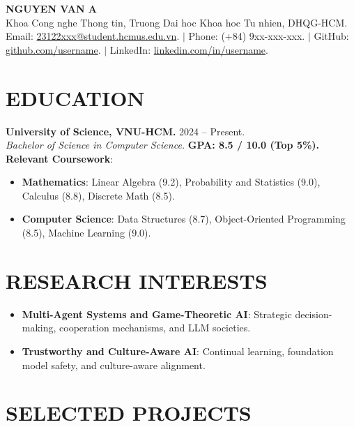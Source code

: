 \documentclass[10pt,a4paper]{article}
\begin{document}
\begin{center}
    {\LARGE \textbf{NGUYEN VAN A}}\\[4pt]
    \small
    Khoa Cong nghe Thong tin, Truong Dai hoc Khoa hoc Tu nhien, DHQG-HCM.\\
    Email: \href{mailto:23122xxx@student.hcmus.edu.vn}{23122xxx@student.hcmus.edu.vn}. \quad$|$\quad
    Phone: (+84) 9xx-xxx-xxx. \quad$|$\quad
    GitHub: \href{https://github.com/username}{github.com/username}. \quad$|$\quad
    LinkedIn: \href{https://linkedin.com/in/username}{linkedin.com/in/username}.
\end{center}

\vspace{-4pt}

\section*{EDUCATION}
\textbf{University of Science, VNU-HCM.} \hfill 2024 -- Present.\\
\textit{Bachelor of Science in Computer Science.} \hfill \textbf{GPA: 8.5 / 10.0 (Top 5\%).}\\
\textbf{Relevant Coursework}:
\begin{itemize}
    \item \textbf{Mathematics}: Linear Algebra (9.2), Probability and Statistics (9.0), Calculus (8.8), Discrete Math (8.5).
    \item \textbf{Computer Science}: Data Structures (8.7), Object-Oriented Programming (8.5), Machine Learning (9.0).
\end{itemize}

\section*{RESEARCH INTERESTS}
\begin{itemize}
    \item \textbf{Multi-Agent Systems and Game-Theoretic AI}: Strategic decision-making, cooperation mechanisms, and LLM societies.
    \item \textbf{Trustworthy and Culture-Aware AI}: Continual learning, foundation model safety, and culture-aware alignment.
\end{itemize}

\section*{SELECTED PROJECTS}
\end{document}
